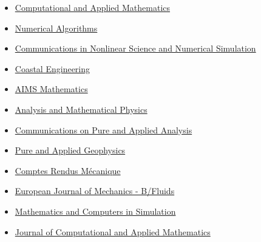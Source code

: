 \begin{itemize}
    \item[$\blacktriangleright$] \href{https://link.springer.com/journal/40314/}%
    {Computational and Applied Mathematics}
    
    \item[$\blacktriangleright$] \href{http://www.springerlink.com/content/101751/}%
    {Numerical Algorithms}
    
    \item[$\blacktriangleright$] \href{http://www.journals.elsevier.com/communications-in-nonlinear-science-and-numerical-simulation}%
    {Communications in Nonlinear Science and Numerical Simulation}

    \item[$\blacktriangleright$] \href{https://www.sciencedirect.com/journal/coastal-engineering/}%
    {Coastal Engineering}

    \item[$\blacktriangleright$] \href{https://www.aimspress.com/journal/Math/}%
    {AIMS Mathematics}
    
    \item[$\blacktriangleright$] \href{https://link.springer.com/journal/13324/}%
    {Analysis and Mathematical Physics}
   
    \item[$\blacktriangleright$] \href{http://aimsciences.org/journals/cpaa/}%
    {Communications on Pure and Applied Analysis}

    \item[$\blacktriangleright$] \href{https://www.springer.com/journal/24}%
    {Pure and Applied Geophysics}
    
    \item[$\blacktriangleright$] \href{http://www.sciencedirect.com/science/journal/16310721}%
    {Comptes Rendus M\'ecanique}
    
    \item[$\blacktriangleright$]  \href{http://www.elsevier.com/wps/find/journaldescription.cws_home/600738/description}%
    {European Journal of Mechanics - B/Fluids}
    
    \item[$\blacktriangleright$] \href{http://www.elsevier.com/wps/find/journaldescription.cws_home/505615/description#description}%
    {Mathematics and Computers in Simulation}

    \item[$\blacktriangleright$] \href{https://www.sciencedirect.com/journal/journal-of-computational-and-applied-mathematics/}%
    {Journal of Computational and Applied Mathematics}


\end{itemize}
